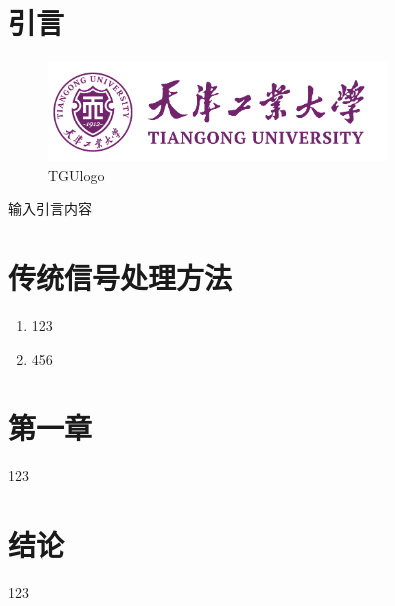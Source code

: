 \documentclass[12pt,hyperref,a4paper,UTF8]{ctexart}
\begin{document}
\cover
\thispagestyle{empty} %

\newpage
\setcounter{page}{1}
\begin{abstract}

\end{abstract}
\keywords{}
\newpage
\tableofcontents

\newpage
\section{引言}
\begin{figure}[htbp]
\centering
\includegraphics[width=0.8\textwidth]{figures/tgu_logo.png}
\caption{TGUlogo}
\end{figure}

输入引言内容

\newpage
\section{传统信号处理方法}

\begin{enumerate}
\item 123
\item 456
\end{enumerate}


\newpage
\section{第一章}
123
\newpage
\section{结论}
123

\newpage
{}
\end{document}
